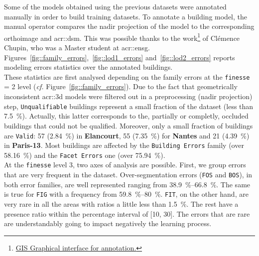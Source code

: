         Some of the models obtained using the previous datasets were annotated manually in order to build training datasets.
        To annotate a building model, the manual operator compares the nadir projection of the model to the corresponding orthoimage and \gls{acr::dsm}.
        This was possible thanks to the work\footnote{\href{https://github.com/CHUPClem/sGrISner.git}{GIS Graphical interface for annotation.}} of Clémence Chupin, who was a Master student at \gls{acr::ensg}.
        Figures~\ref{fig::family_errors},~\ref{fig::lod1_errors} and~\ref{fig::lod2_errors} reports modeling errors statistics over the annotated buildings.\\

        These statistics are first analysed depending on the family errors at the \texttt{finesse} = 2 level (\textit{cf.} Figure~\ref{fig::family_errors}).
        Due to the fact that geometrically inconsistent \gls{acr::3d} models were filtered out in a preprocessing (nadir projection) step, \texttt{Unqualifiable} buildings represent a small fraction of the dataset (less than \SI{7.5}{\percent}).
        Actually, this latter corresponds to the, partially or completly, occluded buildings that could not be qualified.
        Moreover, only a small fraction of buildings are \texttt{Valid}:
        57 (\SI{2.84}{\percent}) in \textbf{Elancourt}, 55 (\SI{7.35}{\percent}) for \textbf{Nantes} and 21 (\SI{4.39}{\percent}) in \textbf{Paris-13}.
        Most buildings are affected by the \texttt{Building Errors} family (over \SI{58.16}{\percent}) and the \texttt{Facet Errors} one (over \SI{75.94}{\percent}).\\

        At the \texttt{finesse} level 3, two axes of analysis are possible.
        First, we group errors that are very frequent in the dataset.
        Over-segmentation errors (\texttt{FOS} and \texttt{BOS}), in both error families, are well represented ranging from \SIrange{38.9}{66.8}{\percent}.
        The same is true for \texttt{FIG} with a frequency from \SIrange{59.8}{80}{\percent}.
        \texttt{FIT}, on the other hand, are very rare in all the areas with ratios a little less than \SI{1.5}{\percent}.
        The rest have a presence ratio within the percentage interval of [10, 30].
        The errors that are rare are understandably going to impact negatively the learning process.\\
        

